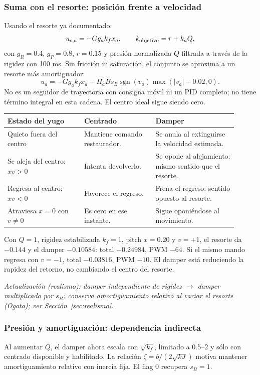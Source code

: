 \documentclass[11pt,a4paper]{article}
\begin{document}
\subsubsection{Suma con el resorte: posición frente a velocidad}
Usando el resorte ya documentado:
\begin{equation}
u_{c,a}=-Gg_ak_fx_a,\qquad
k_{\rm objetivo}=r+k_aQ,
\end{equation}
con $g_R=0.4$, $g_P=0.8$, $r=0.15$ y presión normalizada $Q$ filtrada a través de la rigidez con 100 ms. Sin fricción ni saturación, el conjunto se aproxima a un resorte más amortiguador:
\begin{equation}
u_a=-Gg_ak_fx_a-H_aBs_B\operatorname{sgn}(v_a)\max(|v_a|-0.02,0).
\end{equation}
No es un seguidor de trayectoria con consigna móvil ni un PID completo; no tiene término integral en esta cadena. El centro ideal sigue siendo cero.

\begin{longtable}{p{0.30\linewidth}p{0.29\linewidth}p{0.32\linewidth}}
\toprule
Estado del yugo & Centrado & Damper\\
\midrule
Quieto fuera del centro & Mantiene comando restaurador. & Se anula al extinguirse la velocidad estimada.\\
Se aleja del centro: $xv>0$ & Intenta devolverlo. & Se opone al alejamiento: mismo sentido que el resorte.\\
Regresa al centro: $xv<0$ & Favorece el regreso. & Frena el regreso: sentido opuesto al resorte.\\
Atraviesa $x=0$ con $v\ne0$ & Es cero en ese instante. & Sigue oponiéndose al movimiento.\\
\bottomrule
\end{longtable}
Con $Q=1$, rigidez estabilizada $k_f=1$, pitch $x=0.20$ y $v=+1$, el resorte da $-0.144$ y el damper $-0.10584$: total $-0.24984$, PWM $-64$. Si el mismo mando regresa con $v=-1$, total $-0.03816$, PWM $-10$. El damper está reduciendo la rapidez del retorno, no cambiando el centro del resorte.

\textit{Actualización (realismo): damper independiente de rigidez $\rightarrow$ damper multiplicado por $s_B$; conserva amortiguamiento relativo al variar el resorte (Ogata); ver Sección~\ref{sec:realismo}.}

\subsubsection{Presión y amortiguación: dependencia indirecta}
Al aumentar $Q$, el damper ahora escala con $\sqrt{k_f}$, limitado a 0.5--2 y sólo con centrado disponible y habilitado. La relación $\zeta=b/(2\sqrt{kJ})$ motiva mantener amortiguamiento relativo con inercia fija. El flag 0 recupera $s_B=1$.
\end{document}
